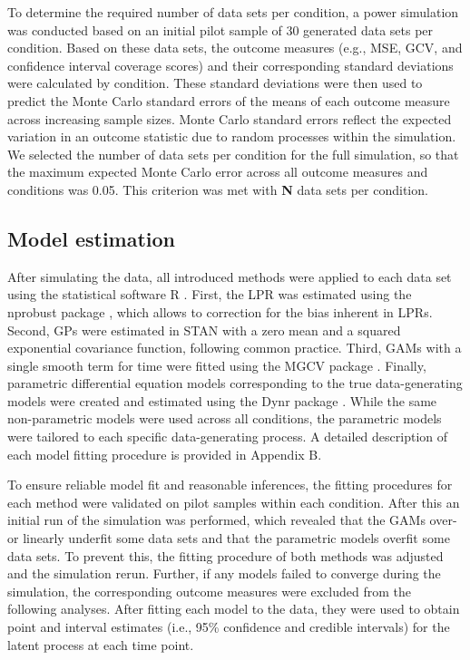 \documentclass[man, floatsintext]{apa7}
\begin{document}
To determine the required number of data sets per condition, a
power simulation was conducted
based on an initial pilot sample of 30 generated data sets per
condition. Based on these data sets, the outcome measures
(e.g., MSE, GCV, and confidence interval coverage scores) and their
corresponding standard deviations were calculated by condition.
These standard deviations were then used to
predict the Monte Carlo standard errors of the means of each outcome measure
across increasing sample sizes. Monte Carlo standard errors reflect the
expected variation in an outcome statistic due to random processes within the
simulation. We selected the number of data sets per condition for the full
simulation, so that the
maximum expected Monte Carlo error across all outcome measures
and conditions was 0.05. This criterion was met with \textbf{N} data sets per
condition.

\subsection{Model estimation}

After simulating the data, all introduced methods were applied to each data set
using the statistical software R \parencite{R-base}. First, the LPR was
estimated using the nprobust package \parencite{R-nprobust}, which allows to
correction for the bias inherent in LPRs. Second, GPs were estimated in STAN
\parencite{R-cmdstanr} with a zero mean and a squared exponential covariance
function, following common practice. Third, GAMs with a single smooth term for
time were fitted using the MGCV package \parencite{R-mgcv_a}. Finally,
parametric differential equation models corresponding to the true
data-generating models were created and estimated using the Dynr package
\parencite{R-dynr}. While the same non-parametric models were used across all
conditions, the parametric models were tailored to each specific
data-generating process. A detailed description of each model fitting procedure
is provided in Appendix B.

To ensure reliable model fit and reasonable inferences, the fitting procedures
for each method were validated on pilot samples within each condition. After
this an initial run of the simulation was performed, which revealed
that the GAMs over- or linearly underfit some data sets and that the parametric
models overfit some data sets. To prevent this, the fitting procedure of
both methods was adjusted and the simulation rerun. Further, if any
models failed to converge during the simulation, the corresponding outcome
measures were excluded from the following analyses. After fitting each model to
the data, they were used to obtain point and interval estimates (i.e.,
95\% confidence and credible intervals) for the latent process at each time
point.
\end{document}
